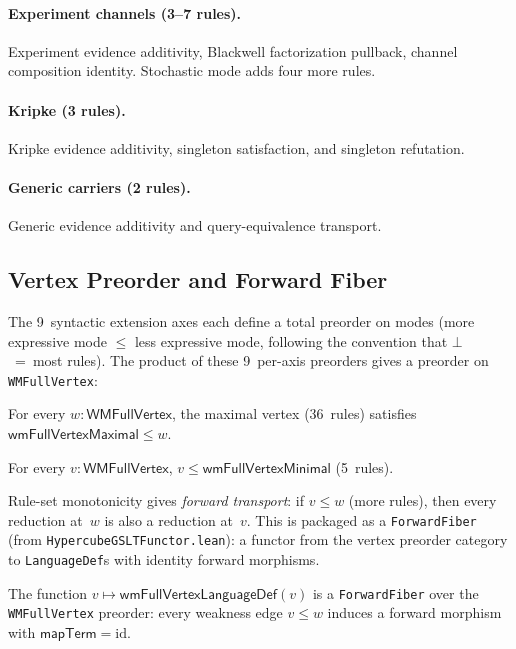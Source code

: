\documentclass[11pt,openany]{report}
\begin{document}
\paragraph{Experiment channels (3--7 rules).}
Experiment evidence additivity, Blackwell factorization pullback, channel
composition identity.  Stochastic mode adds four more rules.

\paragraph{Kripke (3 rules).}
Kripke evidence additivity, singleton satisfaction, and singleton refutation.

\paragraph{Generic carriers (2 rules).}
Generic evidence additivity and query-equivalence transport.

\subsection{Vertex Preorder and Forward Fiber}
\label{sec:wm-vertex-preorder}

The 9~syntactic extension axes each define a total preorder on modes
(more expressive mode $\le$ less expressive mode, following the convention
that $\bot$~=~most rules).  The product of these 9~per-axis preorders
gives a preorder on \texttt{WMFullVertex}:

\begin{theorem}
For every $w : \mathsf{WMFullVertex}$, the maximal vertex (36~rules)
satisfies $\mathsf{wmFullVertexMaximal} \le w$.
\end{theorem}

\begin{theorem}
For every $v : \mathsf{WMFullVertex}$, $v \le \mathsf{wmFullVertexMinimal}$
(5~rules).
\end{theorem}

\noindent
Rule-set monotonicity gives \emph{forward transport}: if $v \le w$
(more rules), then every reduction at~$w$ is also a reduction at~$v$.
This is packaged as a \texttt{ForwardFiber} (from
\texttt{HypercubeGSLTFunctor.lean}): a functor from the vertex preorder
category to \texttt{LanguageDef}s with identity forward morphisms.

\begin{theorem}
The function $v \mapsto \mathsf{wmFullVertexLanguageDef}(v)$ is a
\texttt{ForwardFiber} over the \texttt{WMFullVertex} preorder:
every weakness edge $v \le w$ induces a forward morphism with
$\mathsf{mapTerm} = \mathrm{id}$.
\end{theorem}
\end{document}
